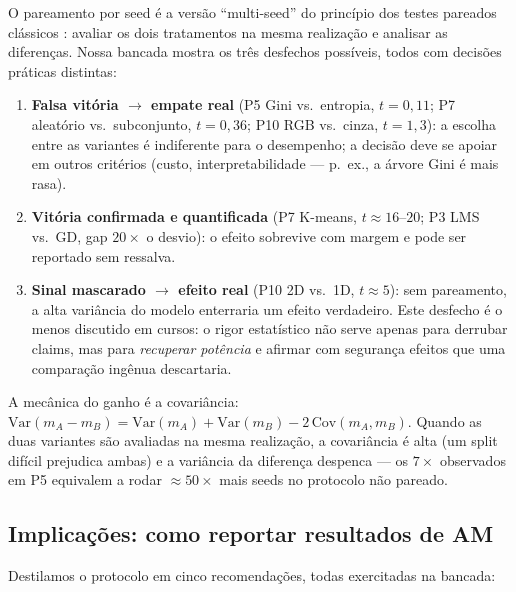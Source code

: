\documentclass[12pt]{article}
\begin{document}
O pareamento por seed é a versão ``multi-seed'' do princípio dos testes
pareados clássicos \cite{dietterich1998}: avaliar os dois tratamentos na
mesma realização e analisar as diferenças. Nossa bancada mostra os três
desfechos possíveis, todos com decisões práticas distintas:

\begin{enumerate}
  \item \textbf{Falsa vitória $\to$ empate real} (P5 Gini vs.\ entropia,
        $t=0{,}11$; P7 aleatório vs.\ subconjunto, $t=0{,}36$; P10 RGB vs.\
        cinza, $t=1{,}3$): a escolha entre as variantes é indiferente para o
        desempenho; a decisão deve se apoiar em outros critérios (custo,
        interpretabilidade --- p.\ ex., a árvore Gini é mais rasa).
  \item \textbf{Vitória confirmada e quantificada} (P7 K-means,
        $t \approx 16$--$20$; P3 LMS vs.\ GD, gap $20\times$ o desvio): o
        efeito sobrevive com margem e pode ser reportado sem ressalva.
  \item \textbf{Sinal mascarado $\to$ efeito real} (P10 2D vs.\ 1D,
        $t \approx 5$): sem pareamento, a alta variância do modelo enterraria
        um efeito verdadeiro. Este desfecho é o menos discutido em cursos: o
        rigor estatístico não serve apenas para derrubar claims, mas para
        \emph{recuperar potência} e afirmar com segurança efeitos que uma
        comparação ingênua descartaria.
\end{enumerate}

A mecânica do ganho é a covariância: $\mathrm{Var}(m_A - m_B) =
\mathrm{Var}(m_A) + \mathrm{Var}(m_B) - 2\,\mathrm{Cov}(m_A, m_B)$. Quando as
duas variantes são avaliadas na mesma realização, a covariância é alta (um
split difícil prejudica ambas) e a variância da diferença despenca --- os
$7\times$ observados em P5 equivalem a rodar $\approx 50\times$ mais seeds no
protocolo não pareado.

\subsection{Implicações: como reportar resultados de AM}
\label{sec:ana-implicacoes}

Destilamos o protocolo em cinco recomendações, todas exercitadas na bancada:
\end{document}

